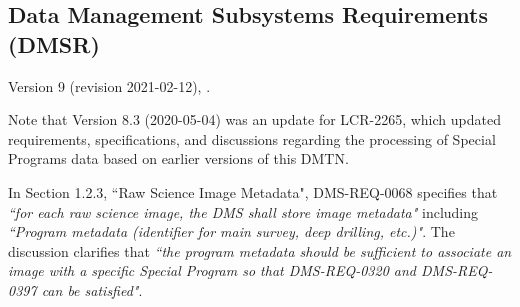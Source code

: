 




\subsection{Data Management Subsystems Requirements (DMSR)}

Version 9 (revision 2021-02-12), . 

Note that Version 8.3 (2020-05-04) was an update for LCR-2265, which updated requirements, specifications, and discussions regarding the processing of Special Programs data based on earlier versions of this DMTN.

In Section 1.2.3, ``Raw Science Image Metadata", DMS-REQ-0068 specifies that {\it ``for each raw science image, the DMS shall store image metadata"} including {\it ``Program metadata (identifier for main survey, deep drilling, etc.)"}.
The discussion clarifies that {\it ``the program metadata should be sufficient to associate an image with a specific Special Program so that DMS-REQ-0320 and DMS-REQ-0397 can be satisfied"}.

